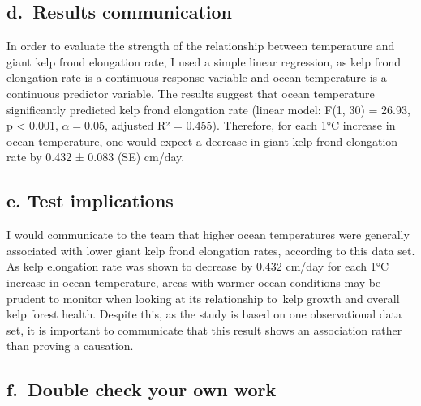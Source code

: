 \documentclass[
  letterpaper,
  DIV=11,
  numbers=noendperiod]{scrartcl}
\newenvironment{Shaded}{\begin{snugshade}}{\end{snugshade}}
\newcommand{\AttributeTok}[1]{\textcolor[rgb]{0.40,0.45,0.13}{#1}}
\newcommand{\CommentTok}[1]{\textcolor[rgb]{0.37,0.37,0.37}{#1}}
\newcommand{\FunctionTok}[1]{\textcolor[rgb]{0.28,0.35,0.67}{#1}}
\newcommand{\NormalTok}[1]{\textcolor[rgb]{0.00,0.23,0.31}{#1}}
\newcommand{\SpecialCharTok}[1]{\textcolor[rgb]{0.37,0.37,0.37}{#1}}
\newcommand{\StringTok}[1]{\textcolor[rgb]{0.13,0.47,0.30}{#1}}
\begin{document}
\subsection{d.~Results communication}\label{d.-results-communication}

In order to evaluate the strength of the relationship between
temperature and giant kelp frond elongation rate, I used a simple linear
regression, as kelp frond elongation rate is a continuous response
variable and ocean temperature is a continuous predictor variable. The
results suggest that ocean temperature significantly predicted kelp
frond elongation rate (linear model: F(1, 30) = 26.93, p \textless{}
0.001, \(\alpha = 0.05\), adjusted R² = 0.455). Therefore, for each 1°C
increase in ocean temperature, one would expect a decrease in giant kelp
frond elongation rate by 0.432 ± 0.083 (SE) cm/day.

\subsection{e. Test implications}\label{e.-test-implications}

I would communicate to the team that higher ocean temperatures were
generally associated with lower giant kelp frond elongation rates,
according to this data set. As kelp elongation rate was shown to
decrease by 0.432 cm/day for each 1°C increase in ocean temperature,
areas with warmer ocean conditions may be prudent to monitor when
looking at its relationship to~kelp growth and overall kelp forest
health. Despite this, as the study is based on one observational data
set, it is important to communicate that this result shows an
association rather than proving a causation.

\subsection{f.~Double check your own
work}\label{f.-double-check-your-own-work}

\begin{Shaded}
\end{Shaded}
\end{document}
